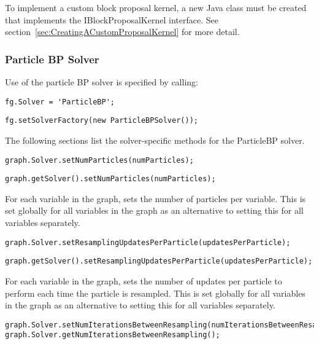 To implement a custom block proposal kernel, a new Java class must be created that implements the IBlockProposalKernel interface.  See section~\ref{sec:CreatingACustomProposalKernel} for more detail.

\subsubsection{Particle BP Solver}

Use of the particle BP solver is specified by calling:

\ifmatlab
\begin{lstlisting}
fg.Solver = 'ParticleBP';
\end{lstlisting}
\fi

\ifjava
\begin{lstlisting}
fg.setSolverFactory(new ParticleBPSolver());
\end{lstlisting}
\fi

The following sections list the solver-specific methods for the ParticleBP solver.


\ifmatlab
\begin{lstlisting}
graph.Solver.setNumParticles(numParticles);
\end{lstlisting}
\fi

\ifjava
\begin{lstlisting}
graph.getSolver().setNumParticles(numParticles);
\end{lstlisting}
\fi

For each variable in the graph, sets the number of particles per variable. This is set globally for all variables in the graph as an alternative to setting this for all variables separately.

\ifmatlab
\begin{lstlisting}
graph.Solver.setResamplingUpdatesPerParticle(updatesPerParticle);
\end{lstlisting}
\fi

\ifjava
\begin{lstlisting}
graph.getSolver().setResamplingUpdatesPerParticle(updatesPerParticle);
\end{lstlisting}
\fi

For each variable in the graph, sets the number of updates per particle to perform each time the particle is resampled. This is set globally for all variables in the graph as an alternative to setting this for all variables separately.

\ifmatlab
\begin{lstlisting}
graph.Solver.setNumIterationsBetweenResampling(numIterationsBetweenResampling);
graph.Solver.getNumIterationsBetweenResampling();
\end{lstlisting}
\fi

